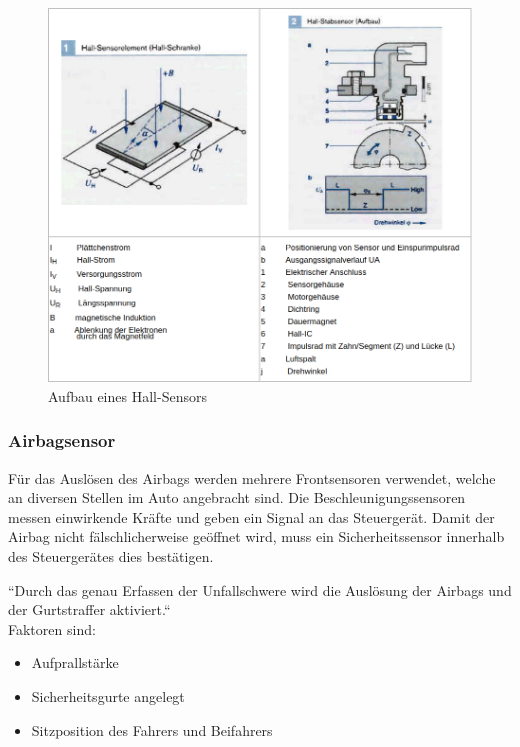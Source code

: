 					\begin{figure}[h]
						\centering
						\includegraphics[width=\textwidth]{hall.png}
						\caption[www.kfztech.de/kfztechnik/elo/sensoren/hallsensor.htm]{Aufbau eines Hall-Sensors}
	                \end{figure}
	                
	                
	
				\subsubsection{Airbagsensor}
	
	                 Für das Auslösen des Airbags werden mehrere Frontsensoren verwendet, welche an diversen Stellen im Auto angebracht sind. Die Beschleunigungssensoren messen einwirkende Kräfte und geben ein Signal an das Steuergerät.
	                 Damit der Airbag nicht fälschlicherweise geöffnet wird, muss ein Sicherheitssensor innerhalb des Steuergerätes dies bestätigen. 
	                 
	                 ``Durch das genau Erfassen der Unfallschwere wird die Auslösung der Airbags und der Gurtstraffer aktiviert.`` \cite{TS_airbag}\\
	                 Faktoren sind: 
	                 
	                 \begin{itemize}
	                     \item Aufprallstärke
	                     \item Sicherheitsgurte angelegt
	                     \item Sitzposition des Fahrers und Beifahrers
	                 \end{itemize}
	             
